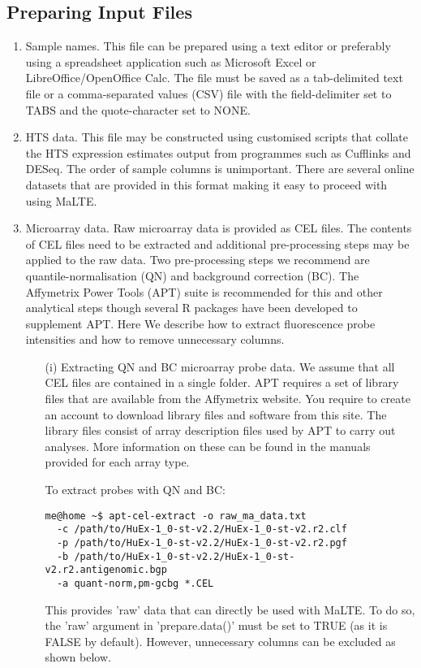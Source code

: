 \documentclass[a4paper,12pt]{article}
\begin{document}
\subsection{Preparing Input Files}
\begin{enumerate}
\item Sample names. This file can be prepared using a text editor or preferably using a spreadsheet application such as Microsoft Excel or LibreOffice/OpenOffice Calc. The file must be saved as a tab-delimited text file or a comma-separated values (CSV) file with the field-delimiter set to TABS and the quote-character set to NONE.

\item HTS data. This file may be constructed using customised scripts that collate the HTS expression estimates output from programmes such as Cufflinks and DESeq. The order of sample columns is unimportant. There are several online datasets that are provided in this format making it easy to proceed with using MaLTE.

\item Microarray data. Raw microarray data is provided as CEL files. The contents of CEL files need to be extracted and additional pre-processing steps may be applied to the raw data. Two pre-processing steps we recommend are quantile-normalisation (QN) and background correction (BC). The Affymetrix Power Tools (APT) suite is recommended for this and other analytical steps though several R packages have been developed to supplement APT.  Here We describe how to extract fluorescence probe intensities and how to remove unnecessary columns.

\begin{enumerate}
\item[(i)] Extracting QN and BC microarray probe data. We assume that all CEL files are contained in a single folder. APT requires a set of library files that are available from the Affymetrix website. You require to create an account to download library files and software from this site. The library files consist of array description files used by APT to carry out analyses. More information on these can be found in the manuals provided for each array type. 

To extract probes with QN and BC:
\begin{verbatim}
me@home ~$ apt-cel-extract -o raw_ma_data.txt 
  -c /path/to/HuEx-1_0-st-v2.2/HuEx-1_0-st-v2.r2.clf 
  -p /path/to/HuEx-1_0-st-v2.2/HuEx-1_0-st-v2.r2.pgf 
  -b /path/to/HuEx-1_0-st-v2.2/HuEx-1_0-st-v2.r2.antigenomic.bgp 
  -a quant-norm,pm-gcbg *.CEL
\end{verbatim}
This provides 'raw' data that can directly be used with MaLTE. To do so, the 'raw' argument in 'prepare.data()' must be set to TRUE (as it is FALSE by default). However, unnecessary columns can be excluded as shown below.


\end{enumerate}
\end{enumerate}
\end{document}
